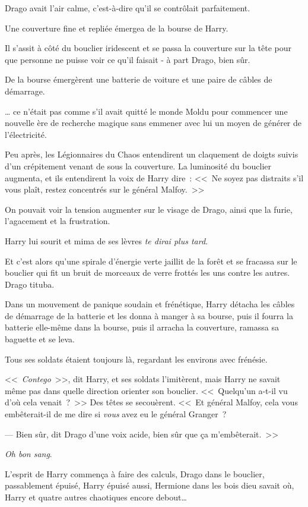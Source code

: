 Drago avait l'air calme, c'est-à-dire qu'il se contrôlait parfaitement.

Une couverture fine et repliée émergea de la bourse de Harry.

Il s'assit à côté du bouclier iridescent et se passa la couverture sur la tête pour que personne ne puisse voir ce qu'il faisait - à part Drago, bien sûr.

De la bourse émergèrent une batterie de voiture et une paire de câbles de démarrage.

… ce n'était pas comme s'il avait quitté le monde Moldu pour commencer une nouvelle ère de recherche magique sans emmener avec lui un moyen de générer de l'électricité.

Peu après, les Légionnaires du Chaos entendirent un claquement de doigts suivis d'un crépitement venant de sous la couverture. La luminosité du bouclier augmenta, et ils entendirent la voix de Harry dire~: <<~Ne soyez pas distraits s'il vous plaît, restez concentrés sur le général Malfoy.~>>

On pouvait voir la tension augmenter sur le visage de Drago, ainsi que la furie, l'agacement et la frustration.

Harry lui sourit et mima de ses lèvres \emph{te dirai plus tard}.

Et c'est alors qu'une spirale d'énergie verte jaillit de la forêt et se fracassa sur le bouclier qui fit un bruit de morceaux de verre frottés les uns contre les autres. Drago tituba.

Dans un mouvement de panique soudain et frénétique, Harry détacha les câbles de démarrage de la batterie et les donna à manger à sa bourse, puis il fourra la batterie elle-même dans la bourse, puis il arracha la couverture, ramassa sa baguette et se leva.

Tous ses soldats étaient toujours là, regardant les environs avec frénésie.

<<~\emph{Contego}~>>, dit Harry, et ses soldats l'imitèrent, mais Harry ne savait même pas dans quelle direction orienter son bouclier. <<~Quelqu'un a-t-il vu d'où cela venait~?~>> Des têtes se secouèrent. <<~Et général Malfoy, cela vous embêterait-il de me dire si \emph{vous} avez eu le général Granger~?

--- Bien sûr, dit Drago d'une voix acide, bien sûr que ça m'embêterait.~>>

\emph{Oh bon sang}.

L'esprit de Harry commença à faire des calculs, Drago dans le bouclier, passablement épuisé, Harry épuisé aussi, Hermione dans les bois dieu savait où, Harry et quatre autres chaotiques encore debout…

